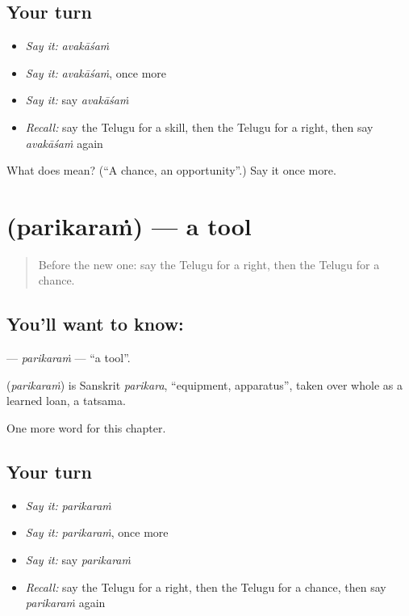 \subsection*{Your turn}
\begin{itemize}
\raggedright
  \item \emph{Say it:} \emph{avakāśaṁ}
  \item \emph{Say it:} \emph{avakāśaṁ}, once more
  \item \emph{Say it:} say \emph{avakāśaṁ}
  \item \emph{Recall:} say the Telugu for a skill, then the Telugu for a right, then say \emph{avakāśaṁ} again
\end{itemize}

\begin{tcolorbox}[breakable,colback=teal!4,colframe=teal!35!black,title={Before you move on}]
What does  mean? (\textquotedblleft{}A chance, an opportunity\textquotedblright{}.) Say it once more.
\end{tcolorbox}
\section[\texorpdfstring{\te{పరికరం} (parikaraṁ)}{పరికరం (parikaraṁ)}]{ (parikaraṁ) — a tool}

\label{lesson:TE-C106-parikaram}



\begin{quote}
Before the new one: say the Telugu for a right, then the Telugu for a chance.
\end{quote}

\subsection*{You'll want to know: }
\textbf{} — \emph{parikaraṁ} — \textquotedblleft{}a tool\textquotedblright{}.

\begin{cousinweb}
\textbf{} (\emph{parikaraṁ}) is Sanskrit \emph{parikara}, \textquotedblleft{}equipment, apparatus\textquotedblright{}, taken over whole as a learned loan, a tatsama.
\end{cousinweb}

\begin{grammarlens}[title={What you've built}]
One more word for this chapter.
\end{grammarlens}

\subsection*{Your turn}
\begin{itemize}
\raggedright
  \item \emph{Say it:} \emph{parikaraṁ}
  \item \emph{Say it:} \emph{parikaraṁ}, once more
  \item \emph{Say it:} say \emph{parikaraṁ}
  \item \emph{Recall:} say the Telugu for a right, then the Telugu for a chance, then say \emph{parikaraṁ} again
\end{itemize}

